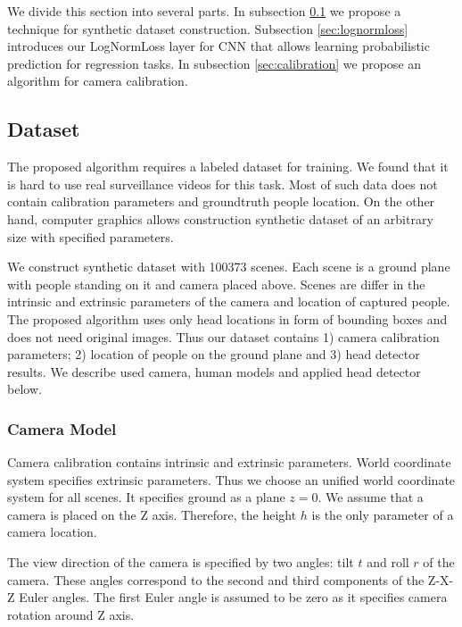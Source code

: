 \noindent We divide this section into several parts. In subsection \ref{sec:dataset} we propose a technique for synthetic dataset construction. Subsection \ref{sec:lognormloss} introduces our LogNormLoss layer for CNN that allows learning probabilistic prediction for regression tasks. In subsection \ref{sec:calibration} we propose an algorithm for camera calibration.

\subsection{Dataset}
\label{sec:dataset}

\noindent The proposed algorithm requires a labeled dataset for training. We found that it is hard to use real surveillance videos for this task. Most of such data does not contain calibration parameters and groundtruth people location. On the other hand, computer graphics allows construction synthetic dataset of an arbitrary size with specified parameters.

We construct synthetic dataset with 100373 scenes. Each scene is a ground plane with people standing on it and camera placed above. Scenes are differ in the intrinsic and extrinsic parameters of the camera and location of captured people. The proposed algorithm uses only head locations in form of bounding boxes and does not need original images. Thus our dataset contains 1) camera calibration parameters; 2) location of people on the ground plane and 3) head detector results. We describe used camera, human models and applied head detector below.

\subsubsection{Camera Model}

\noindent Camera calibration contains intrinsic and extrinsic parameters. World coordinate system specifies extrinsic parameters. Thus we choose an unified world coordinate system for all scenes. It specifies ground as a plane $z = 0$. We assume that a camera is placed on the Z axis. Therefore, the height $h$ is the only parameter of a camera location.

The view direction of the camera is specified by two angles: tilt $t$ and roll $r$ of the camera. These angles correspond to the second and third components of the Z-X-Z Euler angles. The first Euler angle is assumed to be zero as it specifies camera rotation around Z axis.

